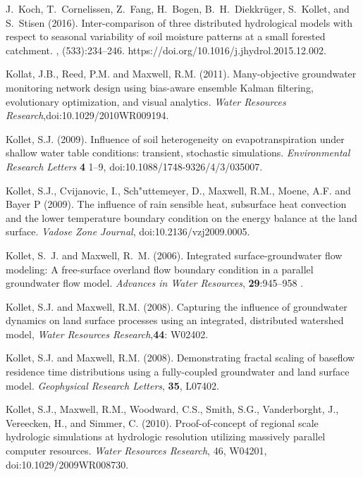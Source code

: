 \begin{thebibliography}{999}
J.~Koch, T.~Cornelissen, Z.~Fang, H.~Bogen, B.~H.~Diekkr{\"u}ger, S.~Kollet,
and S.~Stisen (2016).
\newblock Inter-comparison of three distributed hydrological models with
  respect to seasonal variability of soil moisture patterns at a small forested
  catchment.
, (533):234--246. https://doi.org/10.1016/j.jhydrol.2015.12.002.


Kollat, J.B., Reed, P.M. and Maxwell, R.M. (2011). Many-objective groundwater monitoring network design using bias-aware ensemble Kalman filtering, evolutionary optimization, and visual analytics. {\em Water Resources Research},doi:10.1029/2010WR009194.

Kollet, S.J. (2009). Influence of soil heterogeneity on evapotranspiration under shallow water table conditions: transient, stochastic simulations. {\em Environmental Research Letters} {\bf 4} 1--9, doi:10.1088/1748-9326/4/3/035007.

Kollet, S.J., Cvijanovic, I., Sch{\a"u}ttemeyer, D., Maxwell, R.M., Moene, A.F. and Bayer P (2009). The influence of rain sensible heat, subsurface heat convection and the lower temperature boundary condition on the energy balance at the land surface. {\em Vadose Zone Journal}, doi:10.2136/vzj2009.0005.

Kollet, S.~J. and Maxwell, R.~M. (2006). Integrated
surface-groundwater flow
  modeling: A free-surface overland flow boundary condition in a parallel
  groundwater flow model. {\em Advances in Water Resources}, {\bf 29}:945--958 .

Kollet, S.J. and Maxwell, R.M. (2008). Capturing the influence of groundwater dynamics on land surface processes using an integrated, distributed watershed model, { \em Water Resources Research},{\bf 44}: W02402.

Kollet, S.J. and Maxwell, R.M. (2008). Demonstrating fractal scaling of baseflow residence time distributions using a fully-coupled groundwater and land surface model. {\em Geophysical Research Letters}, {\bf 35}, L07402. 

Kollet, S.J., Maxwell, R.M., Woodward, C.S., Smith, S.G., Vanderborght, J., Vereecken, H., and Simmer, C. (2010). Proof-of-concept of regional scale hydrologic simulations at hydrologic resolution utilizing massively parallel computer resources. {\em Water Resources Research}, 46, W04201, doi:10.1029/2009WR008730.


\end{thebibliography}

